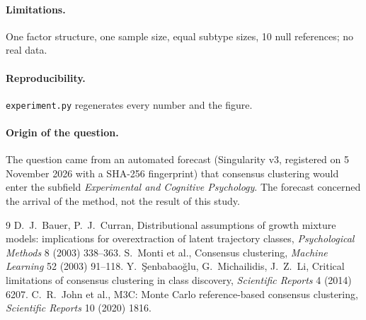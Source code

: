 \documentclass[11pt]{article}
\begin{document}
\paragraph{Limitations.} One factor structure, one sample size, equal subtype sizes, 10 null references; no
real data.

\paragraph{Reproducibility.} \texttt{experiment.py} regenerates every number and the figure.

\paragraph{Origin of the question.} The question came from an automated forecast (Singularity v3, registered on 5
November 2026 with a SHA-256 fingerprint) that consensus clustering would enter the subfield \emph{Experimental and
Cognitive Psychology}. The forecast concerned the arrival of the method, not the result of this study.

\begin{thebibliography}{9}
 D.~J.~Bauer, P.~J.~Curran, Distributional assumptions of growth mixture models: implications for
overextraction of latent trajectory classes, \emph{Psychological Methods} 8 (2003) 338--363.
 S.~Monti et al., Consensus clustering, \emph{Machine Learning} 52 (2003) 91--118.
 Y.~\c{S}enbabao\u{g}lu, G.~Michailidis, J.~Z.~Li, Critical limitations of consensus clustering in
class discovery, \emph{Scientific Reports} 4 (2014) 6207.
 C.~R.~John et al., M3C: Monte Carlo reference-based consensus clustering, \emph{Scientific Reports} 10
(2020) 1816.
\end{thebibliography}
\end{document}
